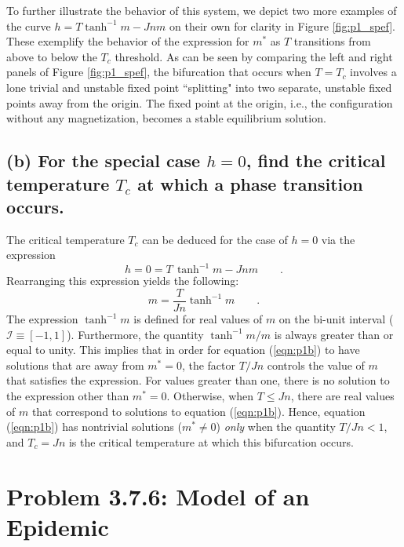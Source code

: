 \documentclass[draft]{agujournal2019}
\begin{document}
To further illustrate the behavior of this system, we depict two more examples of the curve $h=T\tanh^{-1}{m} - Jnm$ on their own for clarity in Figure \ref{fig:p1_spef}. These exemplify the behavior of the expression for $m^*$ as $T$ transitions from above to below the $T_c$ threshold. As can be seen by comparing the left and right panels of Figure \ref{fig:p1_spef}, the bifurcation that occurs when $T=T_c$ involves a lone trivial and unstable fixed point ``splitting" into two separate, unstable fixed points away from the origin. The fixed point at the origin, i.e., the configuration without any magnetization, becomes a stable equilibrium solution. 
\par


\subsection{(b) For the special case $h=0$, find the critical temperature $T_c$ at which a phase transition occurs.}
\label{ssec:p1b}

The critical temperature $T_c$ can be deduced for the case of $h=0$ via the expression 
\begin{equation*}
    h = 0 = T\,\tanh^{-1}{m} - Jnm \qquad .
\end{equation*}
Rearranging this expression yields the following:
\begin{equation}
\label{eqn:p1b}
    m = \frac{T}{Jn} \tanh^{-1}{m} \qquad .
\end{equation}
The expression $\tanh^{-1}{m}$ is defined for real values of $m$ on the bi-unit interval ($\mathcal{I}\equiv[-1,1]$). Furthermore, the quantity $\tanh^{-1}{m}/m$ is always greater than or equal to unity. This implies that in order for equation (\ref{eqn:p1b}) to have solutions that are away from $m^*=0$, the factor $T/Jn$ controls the value of $m$ that satisfies the expression. For values greater than one, there is no solution to the expression other than $m^*=0$. Otherwise, when $T\leq Jn$, there are real values of $m$ that correspond to solutions to equation (\ref{eqn:p1b}). Hence, equation (\ref{eqn:p1b}) has nontrivial solutions ($m^*\neq0$) \emph{only} when the quantity $T/Jn<1$, and $T_c=Jn$ is the critical temperature at which this bifurcation occurs. 












\section{Problem 3.7.6: Model of an Epidemic}
\label{sec:p2}
\end{document}

